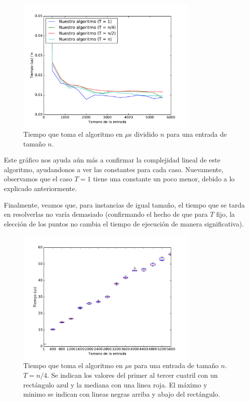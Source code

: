 \begin{figure}[H]
 \centering
	\includegraphics[width=0.8\textwidth]{img/tiempos/genkidama2.pdf}
	\caption{\footnotesize Tiempo que toma el algoritmo en $\mu$s dividido $n$ para una entrada de tamaño $n$.}
	\label{fig:genkidama-tiempos2}
\end{figure}

Este gráfico nos ayuda aún más a confirmar la complejidad lineal de este algoritmo, ayudandonos a ver las constantes para cada caso. Nuevamente, observamos que el caso $T = 1$ tiene una constante un poco menor, debido a lo explicado anteriormente.

Finalmente, veamos que, para instancias de igual tamaño, el tiempo que se tarda en resolverlas no varía demasiado (confirmando el hecho de que para $T$ fijo, la elección de los puntos no cambia el tiempo de ejecución de manera significativa).

\begin{figure}[H]
 \centering
	\includegraphics[width=0.8\textwidth]{img/tiempos/genkidama3.pdf}
	\caption{\footnotesize Tiempo que toma el algoritmo en $\mu$s para una entrada de tamaño $n$. $T = n/4$. Se indican los valores del primer al tercer cuatril con un rectángulo azul y la mediana con una linea roja. El máximo y minimo se indican con lineas negras arriba y abajo del rectángulo.}
	\label{fig:genkidama-tiempos3}
\end{figure}

